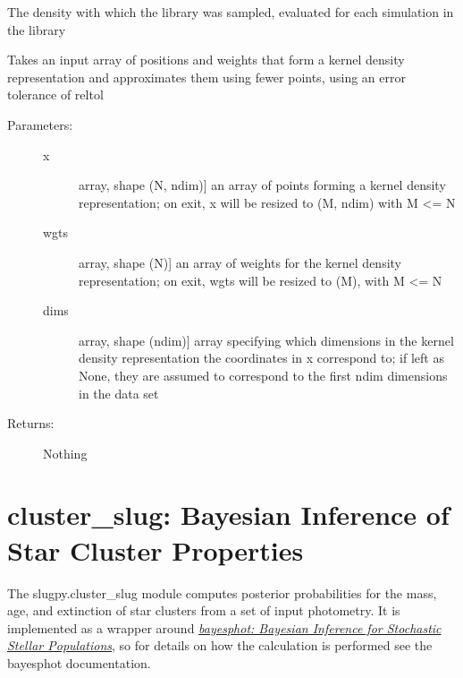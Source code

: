 \documentclass[letterpaper,10pt,english]{sphinxmanual}
\begin{document}
\begin{fulllineitems}
\begin{fulllineitems}
\label{bayesphot:slugpy.bayesphot.bp.bp.sample_density}
The density with which the library was sampled, evaluated for
each simulation in the library

\end{fulllineitems}


\begin{fulllineitems}
\label{bayesphot:slugpy.bayesphot.bp.bp.squeeze_rep}
Takes an input array of positions and weights that form a
kernel density representation and approximates them using
fewer points, using an error tolerance of reltol
\begin{description}
\item[{Parameters:}] \leavevmode\begin{description}
\item[{x}] \leavevmode{[}array, shape (N, ndim){]}
an array of points forming a kernel density
representation; on exit, x will be resized to (M, ndim)
with M \textless{}= N

\item[{wgts}] \leavevmode{[}array, shape (N){]}
an array of weights for the kernel density
representation; on exit, wgts will be resized to (M),
with M \textless{}= N

\item[{dims}] \leavevmode{[}array, shape (ndim){]}
array specifying which dimensions in the kernel density
representation the coordinates in x correspond to; if
left as None, they are assumed to correspond to the
first ndim dimensions in the data set

\end{description}

\item[{Returns:}] \leavevmode
Nothing

\end{description}

\end{fulllineitems}


\end{fulllineitems}



\chapter{cluster\_slug: Bayesian Inference of Star Cluster Properties}
\label{cluster_slug:sec-cluster-slug}\label{cluster_slug::doc}\label{cluster_slug:cluster-slug-bayesian-inference-of-star-cluster-properties}
The slugpy.cluster\_slug module computes posterior probabilities for the mass, age, and extinction of star clusters from a set of input photometry.  It is implemented as a wrapper around {\hyperref[bayesphot:sec\string-bayesphot]{\emph{bayesphot: Bayesian Inference for Stochastic Stellar Populations}}}, so for details on how the calculation is performed see the bayesphot documentation.
\end{document}
